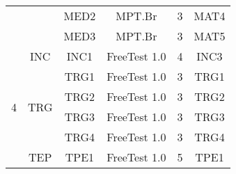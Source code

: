 \begin{table}[H]
{\begin{tabular}{|c|c|c|c|c|c|}
                                                                                        &                      & MED2        & MPT.Br          & 3                                                                                   & MAT4                                                                      \\ \cline{3-6} 
                                                                                        &                      & MED3        & MPT.Br          & 3                                                                                   & MAT5                                                                      \\ \hline
\multirow{9}{*}{4}                                                                      & INC                  & INC1        & FreeTest 1.0    & 4                                                                                   & INC3                                                                      \\ \cline{2-6} 
                                                                                        & \multirow{4}{*}{TRG} & TRG1        & FreeTest 1.0    & 3                                                                                   & TRG1                                                                      \\ \cline{3-6} 
                                                                                        &                      & TRG2        & FreeTest 1.0    & 3                                                                                   & TRG2                                                                      \\ \cline{3-6} 
                                                                                        &                      & TRG3        & FreeTest 1.0    & 3                                                                                   & TRG3                                                                      \\ \cline{3-6} 
                                                                                        &                      & TRG4        & FreeTest 1.0    & 3                                                                                   & TRG4                                                                      \\ \cline{2-6} 
                                                                                        & \multirow{4}{*}{TEP} & TPE1        & FreeTest 1.0    & 5                                                                                   & TPE1                                                                      \\ \cline{3-6} 

\end{tabular}}
\end{table}
